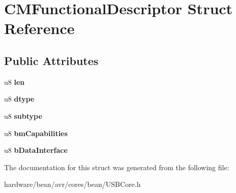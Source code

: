 \hypertarget{struct_c_m_functional_descriptor}{}\section{C\+M\+Functional\+Descriptor Struct Reference}
\label{struct_c_m_functional_descriptor}
\subsection*{Public Attributes}
\begin{DoxyCompactItemize}
\item 
\hypertarget{struct_c_m_functional_descriptor_ad1d12222b3392d7b522bb96b57150324}{}u8 {\bfseries len}\label{struct_c_m_functional_descriptor_ad1d12222b3392d7b522bb96b57150324}

\item 
\hypertarget{struct_c_m_functional_descriptor_ab76c402780d22b9410950a5a007f2d9c}{}u8 {\bfseries dtype}\label{struct_c_m_functional_descriptor_ab76c402780d22b9410950a5a007f2d9c}

\item 
\hypertarget{struct_c_m_functional_descriptor_a07b6c7a42fb152c50eeee9f8e80b7552}{}u8 {\bfseries subtype}\label{struct_c_m_functional_descriptor_a07b6c7a42fb152c50eeee9f8e80b7552}

\item 
\hypertarget{struct_c_m_functional_descriptor_ab7e0bfe190791304ff4fdda9daa4c0bd}{}u8 {\bfseries bm\+Capabilities}\label{struct_c_m_functional_descriptor_ab7e0bfe190791304ff4fdda9daa4c0bd}

\item 
\hypertarget{struct_c_m_functional_descriptor_aea53687b85e0c589de6923a53023e6a6}{}u8 {\bfseries b\+Data\+Interface}\label{struct_c_m_functional_descriptor_aea53687b85e0c589de6923a53023e6a6}

\end{DoxyCompactItemize}


The documentation for this struct was generated from the following file\+:\begin{DoxyCompactItemize}
\item 
hardware/bean/avr/cores/bean/U\+S\+B\+Core.\+h\end{DoxyCompactItemize}
